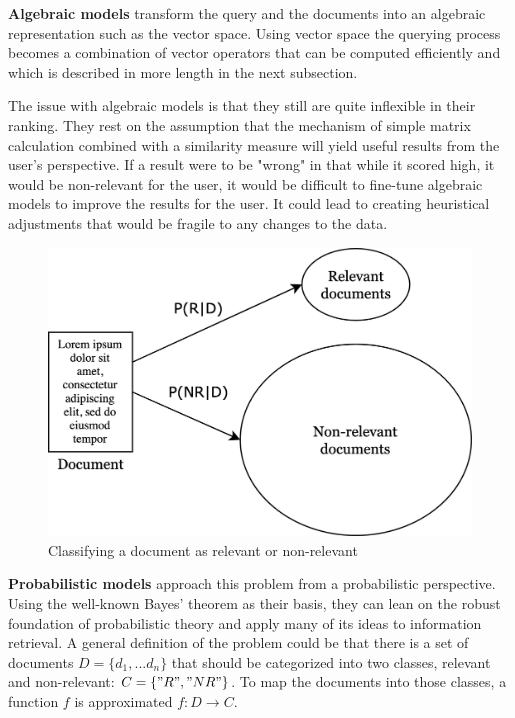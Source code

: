\textbf{Algebraic models} transform the query and the documents into an algebraic representation such as the vector space. Using vector space the querying process becomes a combination of vector operators that can be computed efficiently and which is described in more length in the next subsection.

The issue with algebraic models is that they still are quite inflexible in their ranking. They rest on the assumption that the mechanism of simple matrix calculation combined with a similarity measure will yield useful results from the user's perspective. If a result were to be "wrong" in that while it scored high, it would be non-relevant for the user, it would be difficult to fine-tune algebraic models to improve the results for the user. It could lead to creating heuristical adjustments that would be fragile to any changes to the data.

\begin{figure}[h!]
\centering 
\includegraphics{images/probabilistic-ir.png}
\caption{Classifying a document as relevant or non-relevant\label{fig:probabilistic-ir}}
\end{figure}

\textbf{Probabilistic models} approach this problem from a probabilistic perspective. Using the well-known Bayes' theorem as their basis, they can lean on the robust foundation of probabilistic theory and apply many of its ideas to information retrieval. A general definition of the problem could be that there is a set of documents $D=\{d_1, ... d_n\}$ that should be categorized into two classes, relevant and non-relevant: $C=\{"R", "NR"\}$. To map the documents into those classes, a function $f$ is approximated $f: D \xrightarrow{} C$.

